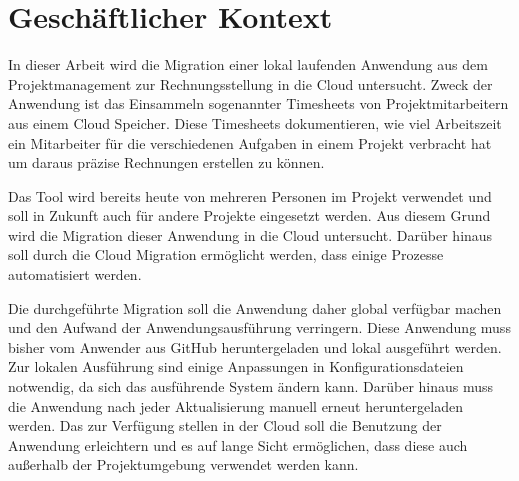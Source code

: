 \section{Geschäftlicher Kontext}

In dieser Arbeit wird die Migration einer lokal laufenden Anwendung aus dem Projektmanagement zur Rechnungsstellung in die Cloud untersucht. Zweck der Anwendung ist das Einsammeln sogenannter Timesheets von Projektmitarbeitern aus einem Cloud Speicher. Diese Timesheets dokumentieren, wie viel Arbeitszeit ein Mitarbeiter für die verschiedenen Aufgaben in einem Projekt verbracht hat um daraus präzise Rechnungen erstellen zu können.

Das Tool wird bereits heute von mehreren Personen im Projekt verwendet und soll in Zukunft auch für andere Projekte eingesetzt werden. Aus diesem Grund wird die Migration dieser Anwendung in die Cloud untersucht.
Darüber hinaus soll durch die Cloud Migration ermöglicht werden, dass einige Prozesse automatisiert werden.


Die durchgeführte Migration soll die Anwendung daher global verfügbar machen und den Aufwand der Anwendungsausführung verringern. Diese Anwendung muss bisher vom Anwender aus GitHub heruntergeladen und lokal ausgeführt werden. Zur lokalen Ausführung sind einige Anpassungen in Konfigurationsdateien notwendig, da sich das ausführende System ändern kann. Darüber hinaus muss die Anwendung nach jeder Aktualisierung manuell erneut heruntergeladen werden. Das zur Verfügung stellen in der Cloud soll die Benutzung der Anwendung erleichtern und es auf lange Sicht ermöglichen, dass diese auch außerhalb der Projektumgebung verwendet werden kann.